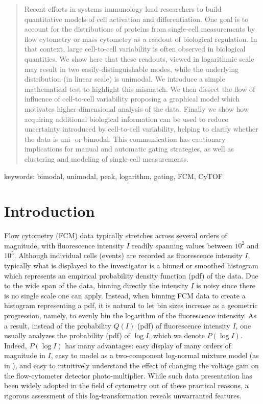 \documentclass[11pt,a4paper,final]{article}
\begin{document}
\newpage 

\begin{abstract}
Recent efforts in systems immunology lead researchers to build quantitative models of cell activation and differentiation. One goal is to account for the distributions of proteins from single-cell measurements by flow cytometry or mass cytometry as a readout of biological regulation. In that context, large cell-to-cell variability is often observed in biological quantities. We show here that these readouts, viewed in logarithmic scale may result in two easily-distinguishable modes, while the underlying distribution (in linear scale) is unimodal. We introduce a simple mathematical test to highlight this mismatch. We then dissect the flow of influence of cell-to-cell variability proposing a graphical model which motivates higher-dimensional analysis of the data. Finally we show how acquiring additional biological information can be used to reduce uncertainty introduced by cell-to-cell variability, helping to clarify whether the data is uni- or bimodal. 
This communication has cautionary implications for manual and automatic gating strategies, as well as clustering and modeling of single-cell measurements. 
\end{abstract}


keywords: bimodal, unimodal, peak, logarithm, gating, FCM, CyTOF



\newpage
\section*{Introduction}

Flow cytometry (FCM) data typically stretches across several orders of magnitude, with fluorescence intensity $I$ readily spanning values between $10^2$ and $10^5$. Although individual cells (events) are recorded as fluorescence intensity $I$, typically what is displayed to the investigator is a binned or smoothed histogram which represents an empirical probability density function (pdf) of the data. Due to the wide span of the data, binning directly the intensity $I$ is noisy since there is no single scale one can apply. Instead, when binning FCM data to create a histogram representing a pdf, it is natural to let bin sizes increase as a geometric progression, namely, to evenly bin the logarithm of the fluorescence intensity. As a result, instead of the probability $Q(I)$ (pdf) of fluorescence intensity $I$, one usually analyzes the probability (pdf) of $\log I$, which we denote $P(\log I)$. Indeed, $P(\log I)$ has many advantages: easy display of many orders of magnitude in $I$, easy to model as a two-component log-normal mixture model (as in \cite{Vogel2016}), and easy to intuitively understand the effect of changing the voltage gain on the flow-cytometer detector photo-multiplier. While such data presentation has been widely adopted in the field of cytometry out of these practical reasons, a rigorous assessment of this log-transformation reveals unwarranted features.
\end{document}
